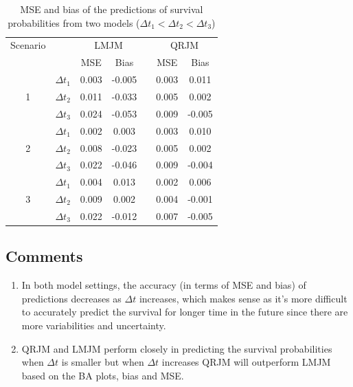\documentclass{article}
\begin{document}
\begin{table}[H]
\centering
\caption{MSE and bias of the predictions of survival probabilities from two models ($\Delta t_1<\Delta t_2<\Delta t_3$)}
\begin{tabular}{ccccccc}
\hline
Scenario & & \multicolumn{2}{c}{LMJM} & & \multicolumn{2}{c}{QRJM} \\
\cline{3-4}\cline{6-7}
 & & MSE & Bias & & MSE & Bias \\
\hline
\multirow{3}{*}{1} & $\Delta t_1$ & 0.003 & -0.005 & & 0.003 & 0.011 \\
& $\Delta t_2$ & 0.011 & -0.033 & & 0.005 & 0.002 \\
& $\Delta t_3$ & 0.024 & -0.053 & & 0.009 & -0.005 \\
\hline
\multirow{3}{*}{2} & $\Delta t_1$ & 0.002 & 0.003 & & 0.003 & 0.010 \\
& $\Delta t_2$ & 0.008 & -0.023 & & 0.005 & 0.002 \\
& $\Delta t_3$ & 0.022 & -0.046 & & 0.009 & -0.004 \\
\hline
\multirow{3}{*}{3} & $\Delta t_1$ & 0.004 & 0.013 & & 0.002 & 0.006 \\
& $\Delta t_2$ & 0.009 & 0.002 & & 0.004 & -0.001 \\
& $\Delta t_3$ & 0.022 & -0.012 & & 0.007 & -0.005 \\
\hline
\end{tabular}
\end{table}




\subsection{Comments}
\begin{enumerate}
\item In both model settings, the accuracy (in terms of MSE and bias) of predictions decreases as $\Delta t$ increases, which makes sense as it's more difficult to accurately predict the survival for longer time in the future since there are more variabilities and uncertainty.
\item QRJM and LMJM perform closely in predicting the survival probabilities when $\Delta t$ is smaller but when $\Delta t$ increases QRJM will outperform LMJM based on the BA plots, bias and MSE.
\end{enumerate}
\end{document}

